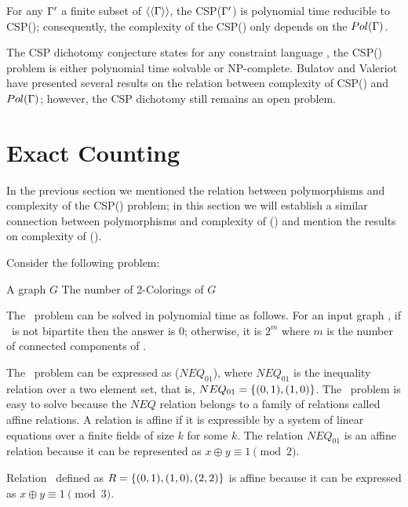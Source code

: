 \begin{cor}
For any \(\Gamma'\) a finite subset of \(\langle\langle \Gamma \rangle\rangle\),
the CSP(\(\Gamma'\)) is polynomial time reducible to  CSP(\mrelset);
consequently, the complexity of the CSP(\mrelset) only depends on the \(Pol(\Gamma)\)\@.
\end{cor}

The CSP dichotomy conjecture states for any constraint language \mrelset, 
the CSP(\mrelset) problem is either polynomial time solvable or NP-complete.
Bulatov and Valeriot \cite{recent08}
have presented several results on the relation between complexity of CSP(\mrelset) and \(Pol(\Gamma)\); however, the CSP dichotomy still remains an open problem. 

\section{Exact Counting}
In the previous section we mentioned the relation between polymorphisms and complexity of
the CSP(\mrelset) problem; in this section we will establish a similar connection 
between polymorphisms and complexity of \ccsp(\mrelset) and mention the
results on complexity of \ccsp(\mrelset)\@.

Consider the following problem:

\pdef{\cdcol}
{A graph \(G\)}
{The number of 2-Colorings of \(G\)}

The \cdcol\ problem can be solved in polynomial time as follows.
For an input graph \mG, if \mG\ is not bipartite then the answer is \(0\); otherwise,
it is \(2^m\) where \(m\) is the number of connected components of \mG\@.

The \cdcol\ problem can be expressed as \ccsp(\(NEQ_{01}\)), where
\(NEQ_{01}\) is the inequality relation over a two element set, that is,
\(NEQ_{01}=\{{(0,1),(1,0)}\}\)\@. 
The \cdcol\ problem is easy to solve because
the \(NEQ\) relation belongs to a family of relations called affine relations.
A relation is affine if it is expressible by a system of linear equations over a
finite fields  of size \(k\) for some \(k\)\@. The relation \(NEQ_{01}\) is an 
affine relation because it can be represented as \(x\oplus y \equiv 1 \pmod{2}\)\@.

\begin{example}
Relation \mR\ defined as \(R=\{{(0,1),(1,0),(2,2)}\}\) is affine because it can be expressed as 
\(x \oplus y \equiv 1 \pmod{3}\)\@.
\end{example}

